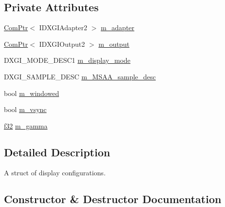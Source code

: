 \subsection*{Private Attributes}
\begin{DoxyCompactItemize}
\item 
\hyperlink{namespacemage_ae74f374780900893caa5555d1031fd79}{Com\+Ptr}$<$ I\+D\+X\+G\+I\+Adapter2 $>$ \hyperlink{structmage_1_1_display_configuration_a3a731fa68cb3924f0528115930073d77}{m\+\_\+adapter}
\item 
\hyperlink{namespacemage_ae74f374780900893caa5555d1031fd79}{Com\+Ptr}$<$ I\+D\+X\+G\+I\+Output2 $>$ \hyperlink{structmage_1_1_display_configuration_a483b3b999f4736084daa819a15adfb80}{m\+\_\+output}
\item 
D\+X\+G\+I\+\_\+\+M\+O\+D\+E\+\_\+\+D\+E\+S\+C1 \hyperlink{structmage_1_1_display_configuration_ac59d5e7c5553ef4842090bf1a83bd7ca}{m\+\_\+display\+\_\+mode}
\item 
D\+X\+G\+I\+\_\+\+S\+A\+M\+P\+L\+E\+\_\+\+D\+E\+SC \hyperlink{structmage_1_1_display_configuration_a1d4de267f8edcd0044252b9658f426c3}{m\+\_\+\+M\+S\+A\+A\+\_\+sample\+\_\+desc}
\item 
bool \hyperlink{structmage_1_1_display_configuration_a0c447e4bd7ea72313315c657e9cd0d95}{m\+\_\+windowed}
\item 
bool \hyperlink{structmage_1_1_display_configuration_a22dd3b35e58260c9555a37aef0e85a4d}{m\+\_\+vsync}
\item 
\hyperlink{namespacemage_a6a44ad388483959dc4dff9f2aef91431}{f32} \hyperlink{structmage_1_1_display_configuration_affa90cc88657b8fa52a4d98844cbdd97}{m\+\_\+gamma}
\end{DoxyCompactItemize}


\subsection{Detailed Description}
A struct of display configurations. 

\subsection{Constructor \& Destructor Documentation}
\hypertarget{structmage_1_1_display_configuration_a936a2c8674b8a6ef63373e088e29f782}{}\label{structmage_1_1_display_configuration_a936a2c8674b8a6ef63373e088e29f782} 
